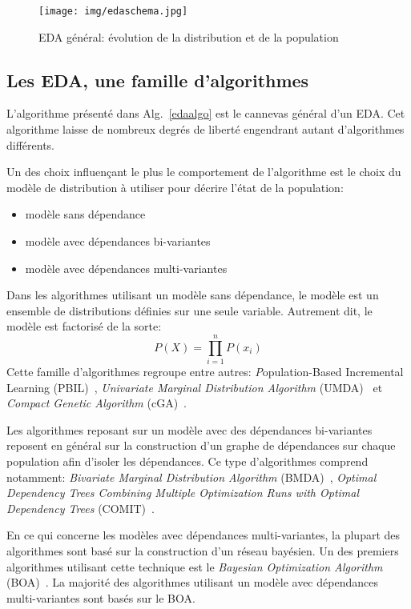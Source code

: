 \documentclass[a4paper, 11pt]{report}
\begin{document}
\begin{figure}[!h]
\centering
\texttt{[image: img/edaschema.jpg]}
\caption{EDA général: évolution de la distribution et de la population~\cite{WIKI_EDA}}
\label{edaschema}
\end{figure}


\subsection{Les EDA, une famille d'algorithmes}
L'algorithme présenté dans Alg.~\ref{edaalgo} est le cannevas général d'un EDA. Cet algorithme laisse de nombreux degrés de liberté engendrant autant d'algorithmes différents.

Un des choix influençant le plus le comportement de l'algorithme est le choix du modèle de distribution à utiliser pour décrire l'état de la population:
\begin{itemize}
\item modèle sans dépendance
\item modèle avec dépendances bi-variantes 
\item modèle avec dépendances multi-variantes
\end{itemize}

Dans les algorithmes utilisant un modèle sans dépendance, le modèle est un ensemble de distributions définies sur une seule variable. Autrement dit, le modèle est factorisé de la sorte:
$$ P(X) = \prod_{i=1}^{n} P(x_i)$$
Cette famille d'algorithmes regroupe entre autres: \textit{P}opulation-{B}ased {I}ncremental {L}earning (PBIL)~\cite{PBIL}, \textit{Univariate Marginal Distribution Algorithm} (UMDA)~\cite{CLEVER_ALGO} et \textit{Compact Genetic Algorithm} (cGA)~\cite{CGA}. %

Les algorithmes reposant sur un modèle avec des dépendances bi-variantes reposent en général sur la construction d'un graphe de dépendances sur chaque population afin d'isoler les dépendances. Ce type d'algorithmes comprend notamment: \textit{Bivariate Marginal Distribution Algorithm} (BMDA)~\cite{BMDA}, \textit{Optimal Dependency Trees Combining Multiple Optimization Runs with Optimal Dependency Trees} (COMIT)~\cite{COMIT}.

En ce qui concerne les modèles avec dépendances multi-variantes, la plupart des algorithmes sont basé sur la construction d'un réseau bayésien. Un des premiers algorithmes utilisant cette technique est le \textit{Bayesian Optimization Algorithm} (BOA)~\cite{BOA}. La majorité des algorithmes utilisant un modèle avec dépendances multi-variantes sont basés sur le BOA.
\end{document}
